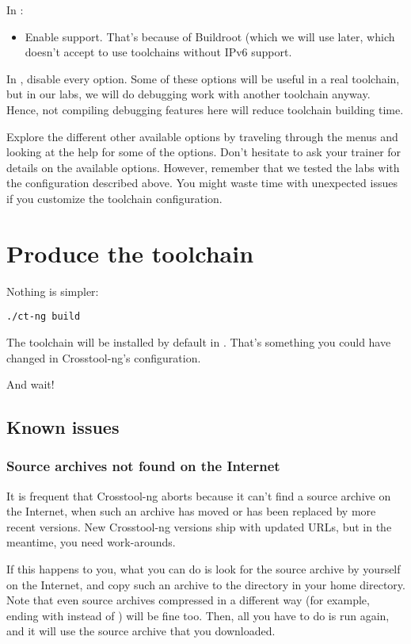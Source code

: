In :
\begin{itemize}
  \item Enable  support. That's because of Buildroot (which
  we will use later, which doesn't accept to use toolchains without IPv6
  support.
\end{itemize}

In , disable every option. Some of these
options will be useful in a real toolchain, but in our labs, we will
do debugging work with another toolchain anyway.  Hence, not compiling
debugging features here will reduce toolchain building time.

Explore the different other available options by traveling through the
menus and looking at the help for some of the options. Don't hesitate
to ask your trainer for details on the available options. However,
remember that we tested the labs with the configuration described
above. You might waste time with unexpected issues if you customize the
toolchain configuration.

\section{Produce the toolchain}

Nothing is simpler:

\begin{verbatim}
./ct-ng build
\end{verbatim}

The toolchain will be installed by default in .
That's something you could have changed in Crosstool-ng's configuration.

And wait!

\subsection{Known issues}

\subsubsection{Source archives not found on the Internet}

It is frequent that Crosstool-ng aborts because it can't find a
source archive on the Internet, when such an archive has moved or has
been replaced by more recent versions. New Crosstool-ng versions ship
with updated URLs, but in the meantime, you need work-arounds.

If this happens to you, what you can do is look for the source archive by
yourself on the Internet, and copy such an archive to the 
directory in your home directory. Note that even source archives
compressed in a different way (for example, ending with 
instead of ) will be fine too. Then, all you have to do is run
 again, and it will use the source archive that you
downloaded.

